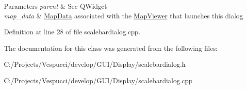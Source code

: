 \begin{DoxyParams}{Parameters}
{\em parent} & See Q\+Widget \\
\hline
{\em map\+\_\+data} & \hyperlink{class_map_data}{Map\+Data} associated with the \hyperlink{class_map_viewer}{Map\+Viewer} that launches this dialog \\
\hline
\end{DoxyParams}


Definition at line 28 of file scalebardialog.\+cpp.



The documentation for this class was generated from the following files\+:\begin{DoxyCompactItemize}
\item 
C\+:/\+Projects/\+Vespucci/develop/\+G\+U\+I/\+Display/scalebardialog.\+h\item 
C\+:/\+Projects/\+Vespucci/develop/\+G\+U\+I/\+Display/scalebardialog.\+cpp\end{DoxyCompactItemize}
